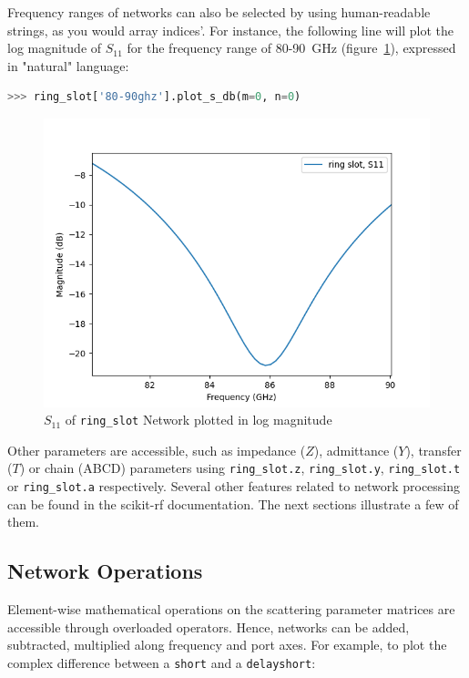 \documentclass{IEEEjmw}
\begin{document}
Frequency ranges of networks can also be selected by using human-readable strings, as you would array indices’. For instance, the following line will plot the log magnitude of $S_{11}$ for the frequency range of 80-90~GHz (figure~\ref{fig:figure2}), expressed in "natural" language:

\begin{lstlisting}[language=Python]
>>> ring_slot['80-90ghz'].plot_s_db(m=0, n=0)
\end{lstlisting}

\begin{figure}
	\centering
	\includegraphics[width=0.95\linewidth]{figures/figure2}
	\caption{$S_{11}$ of \texttt{ring\_slot} Network plotted in log magnitude}
	\label{fig:figure2}
\end{figure}

Other parameters are accessible, such as impedance ($Z$), admittance ($Y$), transfer ($T$) or chain (ABCD) parameters using \texttt{ring\_slot.z}, \texttt{ring\_slot.y}, \texttt{ring\_slot.t} or \texttt{ring\_slot.a} respectively. Several other features related to network processing can be found in the scikit-rf documentation. The next sections illustrate a few of them. 

\subsection{Network Operations}
Element-wise mathematical operations on the scattering parameter matrices are accessible through overloaded operators. Hence, networks can be added, subtracted, multiplied along frequency and port axes. For example, to plot the complex difference between a \texttt{short} and a \texttt{delayshort}:
\end{document}
